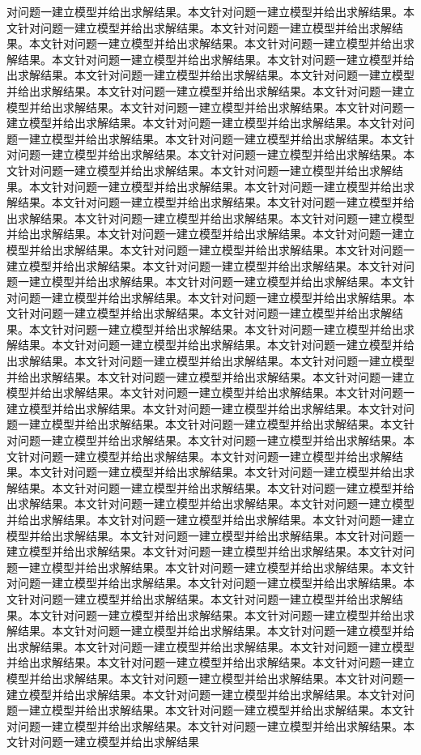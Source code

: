 对问题一建立模型并给出求解结果。本文针对问题一建立模型并给出求解结果。本文针对问题一建立模型并给出求解结果。本文针对问题一建立模型并给出求解结果。本文针对问题一建立模型并给出求解结果。本文针对问题一建立模型并给出求解结果。本文针对问题一建立模型并给出求解结果。本文针对问题一建立模型并给出求解结果。本文针对问题一建立模型并给出求解结果。本文针对问题一建立模型并给出求解结果。本文针对问题一建立模型并给出求解结果。本文针对问题一建立模型并给出求解结果。本文针对问题一建立模型并给出求解结果。本文针对问题一建立模型并给出求解结果。本文针对问题一建立模型并给出求解结果。本文针对问题一建立模型并给出求解结果。本文针对问题一建立模型并给出求解结果。本文针对问题一建立模型并给出求解结果。本文针对问题一建立模型并给出求解结果。本文针对问题一建立模型并给出求解结果。本文针对问题一建立模型并给出求解结果。本文针对问题一建立模型并给出求解结果。本文针对问题一建立模型并给出求解结果。本文针对问题一建立模型并给出求解结果。本文针对问题一建立模型并给出求解结果。本文针对问题一建立模型并给出求解结果。本文针对问题一建立模型并给出求解结果。本文针对问题一建立模型并给出求解结果。本文针对问题一建立模型并给出求解结果。本文针对问题一建立模型并给出求解结果。本文针对问题一建立模型并给出求解结果。本文针对问题一建立模型并给出求解结果。本文针对问题一建立模型并给出求解结果。本文针对问题一建立模型并给出求解结果。本文针对问题一建立模型并给出求解结果。本文针对问题一建立模型并给出求解结果。本文针对问题一建立模型并给出求解结果。本文针对问题一建立模型并给出求解结果。本文针对问题一建立模型并给出求解结果。本文针对问题一建立模型并给出求解结果。本文针对问题一建立模型并给出求解结果。本文针对问题一建立模型并给出求解结果。本文针对问题一建立模型并给出求解结果。本文针对问题一建立模型并给出求解结果。本文针对问题一建立模型并给出求解结果。本文针对问题一建立模型并给出求解结果。本文针对问题一建立模型并给出求解结果。本文针对问题一建立模型并给出求解结果。本文针对问题一建立模型并给出求解结果。本文针对问题一建立模型并给出求解结果。本文针对问题一建立模型并给出求解结果。本文针对问题一建立模型并给出求解结果。本文针对问题一建立模型并给出求解结果。本文针对问题一建立模型并给出求解结果。本文针对问题一建立模型并给出求解结果。本文针对问题一建立模型并给出求解结果。本文针对问题一建立模型并给出求解结果。本文针对问题一建立模型并给出求解结果。本文针对问题一建立模型并给出求解结果。本文针对问题一建立模型并给出求解结果。本文针对问题一建立模型并给出求解结果。本文针对问题一建立模型并给出求解结果。本文针对问题一建立模型并给出求解结果。本文针对问题一建立模型并给出求解结果。本文针对问题一建立模型并给出求解结果。本文针对问题一建立模型并给出求解结果。本文针对问题一建立模型并给出求解结果。本文针对问题一建立模型并给出求解结果。本文针对问题一建立模型并给出求解结果。本文针对问题一建立模型并给出求解结果。本文针对问题一建立模型并给出求解结果。本文针对问题一建立模型并给出求解结果。本文针对问题一建立模型并给出求解结果。本文针对问题一建立模型并给出求解结果。本文针对问题一建立模型并给出求解结果。本文针对问题一建立模型并给出求解结果。本文针对问题一建立模型并给出求解结果。本文针对问题一建立模型并给出求解结果。本文针对问题一建立模型并给出求解结果。本文针对问题一建立模型并给出求解结果。本文针对问题一建立模型并给出求解结果。本文针对问题一建立模型并给出求解结果。本文针对问题一建立模型并给出求解结果。本文针对问题一建立模型并给出求解结果。本文针对问题一建立模型并给出求解结果。本文针对问题一建立模型并给出求解结果。本文针对问题一建立模型并给出求解结果。本文针对问题一建立模型并给出求解结果